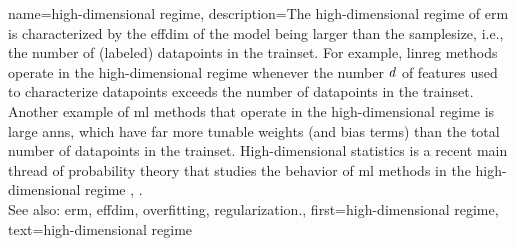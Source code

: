{name={high-dimensional regime}, 
	description={The 
		high-dimensional regime of \gls{erm} is characterized by the \gls{effdim} of the \gls{model} 
		being larger than the \gls{samplesize}, i.e., the number of (labeled) \glspl{datapoint} in the \gls{trainset}. 
		For example, \gls{linreg} methods operate in the high-dimensional regime whenever the number $d$ of \glspl{feature} 
		used to characterize \glspl{datapoint} exceeds the number of \glspl{datapoint} in the \gls{trainset}. 
		Another example of \gls{ml} methods that operate in the high-dimensional regime is large \glspl{ann}, which have 
		far more tunable \glspl{weight} (and bias terms) than the total number of \glspl{datapoint} in the \gls{trainset}. 
		High-dimensional statistics is a recent main thread of \gls{probability} theory that studies the 
		behavior of \gls{ml} methods in the high-dimensional regime \cite{Wain2019}, \cite{BuhlGeerBook}.
				\\
		See also: \gls{erm}, \gls{effdim}, \gls{overfitting}, \gls{regularization}.},
   	first={high-dimensional regime},
	text={high-dimensional regime} 
}

